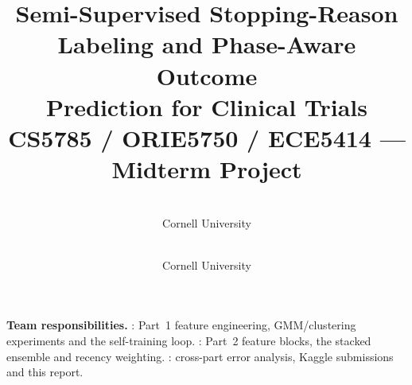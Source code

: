 \documentclass[10pt,twocolumn,letterpaper]{article}
\title{Semi-Supervised Stopping-Reason Labeling and Phase-Aware Outcome\\
Prediction for Clinical Trials\\
\vspace{0.35em}
\large CS5785 / ORIE5750 / ECE5414 --- Midterm Project}
\author{\TODO{Team member 1}\\
Cornell University\\
{\tt\small \TODO{netid1@cornell.edu}}
\and
\TODO{Team member 2}\\
Cornell University\\
{\tt\small \TODO{netid2@cornell.edu}}
}
\begin{document}
\maketitle



\noindent\textbf{Team responsibilities.}
: Part~1 feature engineering, GMM/clustering experiments and the
self-training loop.
: Part~2 feature blocks, the stacked ensemble and recency weighting.
: cross-part error analysis, Kaggle submissions and this report.





{
    \small
    
    
}
\end{document}
